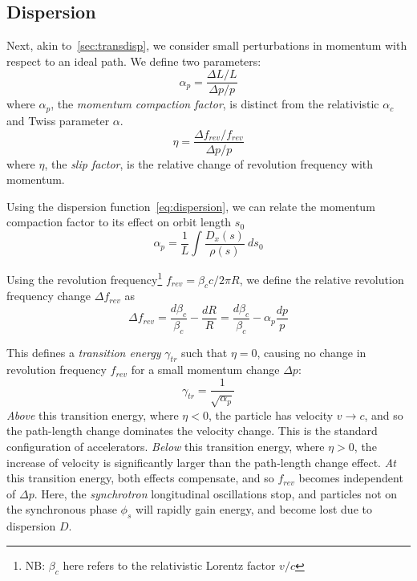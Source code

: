\documentclass[a4paper,twoside,11pt]{report}
\begin{document}
\subsection{Dispersion}

Next, akin to~\autoref{sec:transdisp}, we consider small perturbations in momentum with respect to an ideal path. We define two parameters:
\begin{equation}
  \alpha_p = \frac{\Delta L/L}{\Delta p/p}
\end{equation} where $\alpha_p$, the \textit{momentum compaction factor}, is distinct from the relativistic $\alpha_c$ and Twiss parameter $\alpha$.
\begin{equation}
  \eta = \frac{\Delta f_{rev}/f_{rev}}{\Delta p/p}
  \label{eq:slip_factor}
\end{equation} where $\eta$, the \textit{slip factor}, is the relative change of revolution frequency with momentum.

Using the dispersion function~\autoref{eq:dispersion}, we can relate the momentum compaction factor to its effect on orbit length $s_0$~\cite[5.1]{lbd:tecker}
\begin{equation}
  \alpha_p=\frac 1L\int\frac{D_x(s)}{\rho(s)}\ ds_0
\end{equation}

Using the revolution frequency\footnote{NB: $\beta_c$ here refers to the relativistic Lorentz factor $v/c$ } $f_{rev}=\beta_c c/2\pi R$, we define the relative revolution frequency change $\Delta f_{rev}$ as
\begin{equation}
  \Delta f_{rev} = \frac{d\beta_c}{\beta_c}-\frac{dR}R=\frac{d\beta_c}{\beta_c}-\alpha_p\frac{dp}p
\end{equation} 



This defines a \textit{transition energy} $\gamma_{tr}$ such that $\eta=0$, causing no change in revolution frequency $f_{rev}$ for a small momentum change $\Delta p$:
\begin{equation}
  \gamma_{tr}=\frac 1{\sqrt{\alpha_p}}
\end{equation}
\textit{Above} this transition energy, where $\eta<0$, the particle has velocity $v\rightarrow c$, and so the path-length change dominates the velocity change. This is the standard configuration of accelerators.
\textit{Below} this transition energy, where $\eta >0$, the increase of velocity is significantly larger than the path-length change effect.
\textit{At} this transition energy, both effects compensate, and so $f_{rev}$ becomes independent of $\Delta p$. Here, the \textit{synchrotron} longitudinal oscillations stop, and particles not on the synchronous phase $\phi_s$ will rapidly gain energy, and become lost due to dispersion $D$.
\end{document}
